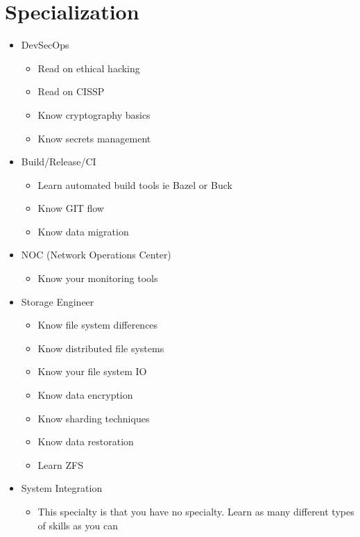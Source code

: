 \documentclass[12pt]{article}
\begin{document}
\section{Specialization}
\begin{itemize}
\item DevSecOps
  \begin{itemize}
  \item Read on ethical hacking
  \item Read on CISSP
  \item Know cryptography basics
  \item Know secrets management
  \end{itemize}
\item Build/Release/CI
  \begin{itemize}
  \item Learn automated build tools ie Bazel or Buck
  \item Know GIT flow
  \item Know data migration
  \end{itemize}
\item NOC (Network Operations Center)
  \begin{itemize}
  \item Know your monitoring tools
  \end{itemize}
\item Storage Engineer
  \begin{itemize}
  \item Know file system differences
  \item Know distributed file systems
  \item Know your file system IO
  \item Know data encryption
  \item Know sharding techniques
  \item Know data restoration
  \item Learn ZFS
  \end{itemize}
\item System Integration
  \begin{itemize}
  \item This specialty is that you have no specialty. Learn as many
    different types of skills as you can
  \end{itemize}
\end{itemize}
\end{document}

